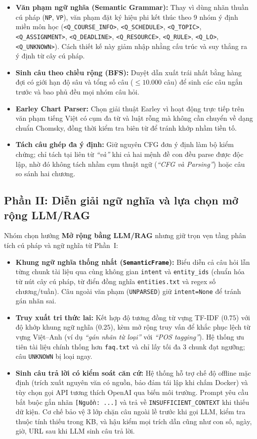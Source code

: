\begin{itemize}
  \item \textbf{Văn phạm ngữ nghĩa (Semantic Grammar):} Thay vì dùng nhãn thuần cú pháp (\texttt{NP}, \texttt{VP}), văn phạm đặt ký hiệu phi kết thúc theo 9 nhóm ý định miền môn học (\texttt{<Q\_COURSE\_INFO>}, \texttt{<Q\_SCHEDULE>}, \texttt{<Q\_TOPIC>}, \texttt{<Q\_ASSIGNMENT>}, \texttt{<Q\_DEADLINE>}, \texttt{<Q\_RESOURCE>}, \texttt{<Q\_RULE>}, \texttt{<Q\_LO>}, \texttt{<Q\_UNKNOWN>}). Cách thiết kế này giảm nhập nhằng cấu trúc và suy thẳng ra ý định từ cây cú pháp.
  \item \textbf{Sinh câu theo chiều rộng (BFS):} Duyệt dẫn xuất trái nhất bằng hàng đợi có giới hạn độ sâu và tổng số câu ($\le 10.000$ câu) để sinh các câu ngắn trước và bao phủ đều mọi nhóm câu hỏi.
  \item \textbf{Earley Chart Parser:} Chọn giải thuật Earley vì hoạt động trực tiếp trên văn phạm tiếng Việt có cụm đa từ và luật rỗng mà không cần chuyển về dạng chuẩn Chomsky, đồng thời kiểm tra biên từ để tránh khớp nhầm tiền tố.
  \item \textbf{Tách câu ghép đa ý định:} Giữ nguyên CFG đơn ý định làm bộ kiểm chứng; chỉ tách tại liên từ \emph{``và''} khi cả hai mệnh đề con đều parse được độc lập, nhờ đó không tách nhầm cụm thuật ngữ (\emph{``CFG và Parsing''}) hoặc câu so sánh hai chương.
\end{itemize}

\subsection{Phần II: Diễn giải ngữ nghĩa và lựa chọn mở rộng LLM/RAG}

Nhóm chọn hướng \textbf{Mở rộng bằng LLM/RAG} nhưng giữ trọn vẹn tầng phân tích cú pháp và ngữ nghĩa từ Phần~I:
\begin{itemize}
  \item \textbf{Khung ngữ nghĩa thống nhất (\texttt{SemanticFrame}):} Biểu diễn cả câu hỏi lẫn từng chunk tài liệu qua cùng không gian \texttt{intent} và \texttt{entity\_ids} (chuẩn hóa từ nút cây cú pháp, từ điển đồng nghĩa \texttt{entities.txt} và regex số chương/tuần). Câu ngoài văn phạm (\texttt{UNPARSED}) giữ \texttt{intent=None} để tránh gán nhãn sai.
  \item \textbf{Truy xuất tri thức lai:} Kết hợp độ tương đồng từ vựng TF-IDF ($0.75$) với độ khớp khung ngữ nghĩa ($0.25$), kèm mở rộng truy vấn để khắc phục lệch từ vựng Việt--Anh (ví dụ \emph{``gán nhãn từ loại''} với \emph{``POS tagging''}). Hệ thống ưu tiên tài liệu chính thống hơn \texttt{faq.txt} và chỉ lấy tối đa 3 chunk đạt ngưỡng; câu \texttt{UNKNOWN} bị loại ngay.
  \item \textbf{Sinh câu trả lời có kiểm soát căn cứ:} Hệ thống hỗ trợ chế độ offline mặc định (trích xuất nguyên văn có nguồn, bảo đảm tái lập khi chấm Docker) và tùy chọn gọi API tương thích OpenAI qua biến môi trường. Prompt yêu cầu bắt buộc gắn nhãn \texttt{[Nguồn: ...]} và trả về \texttt{INSUFFICIENT\_CONTEXT} khi thiếu dữ kiện. Cơ chế bảo vệ 3 lớp chặn câu ngoài lề trước khi gọi LLM, kiểm tra thuộc tính thiếu trong KB, và hậu kiểm mọi trích dẫn cũng như con số, ngày, giờ, URL sau khi LLM sinh câu trả lời.
\end{itemize}

